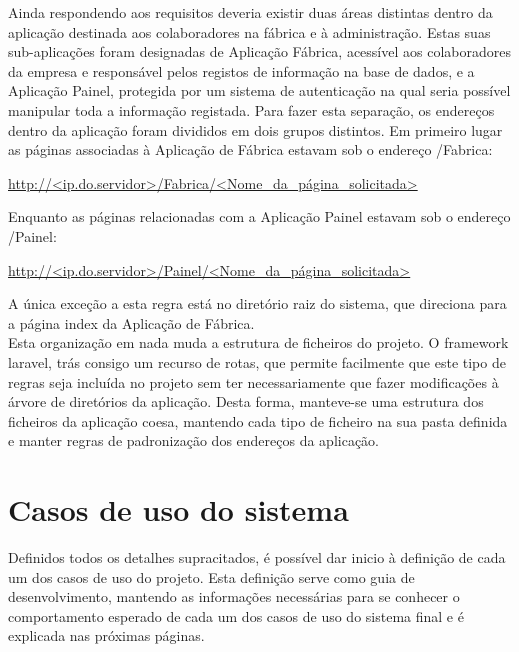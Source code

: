 \noindent 
Ainda respondendo aos requisitos deveria existir duas áreas distintas dentro da aplicação destinada aos colaboradores na fábrica e à administração.
Estas suas sub-aplicações foram designadas de Aplicação Fábrica, acessível aos colaboradores da empresa e responsável pelos registos de informação na base de dados, e a Aplicação Painel, protegida por um sistema de autenticação na qual seria possível manipular toda a informação registada.
Para fazer esta separação, os endereços dentro da aplicação foram divididos em dois grupos distintos. Em primeiro lugar as páginas associadas à Aplicação de Fábrica estavam sob o endereço /Fabrica:

\begin{center}
\url{http://<ip.do.servidor>/Fabrica/<Nome_da_página_solicitada>}
\end{center}

\noindent 
Enquanto as páginas relacionadas com a Aplicação Painel estavam sob o endereço /Painel:

\begin{center}
	\url{http://<ip.do.servidor>/Painel/<Nome_da_página_solicitada>}
\end{center}

\noindent 
A única exceção a esta regra está no diretório raiz do sistema, que direciona para a página index da Aplicação de Fábrica.\\
Esta organização em nada muda a estrutura de ficheiros do projeto. O framework laravel, trás consigo um recurso de rotas, que permite facilmente que este tipo de regras seja incluída no projeto sem ter necessariamente que fazer modificações à árvore de diretórios da aplicação. Desta forma, manteve-se uma estrutura dos ficheiros da aplicação coesa, mantendo cada tipo de ficheiro na sua pasta definida e manter regras de padronização dos endereços da aplicação.

\section{Casos de uso do sistema}
Definidos todos os detalhes supracitados, é possível dar inicio à definição de cada um dos casos de uso do projeto. Esta definição serve como guia de desenvolvimento, mantendo as informações necessárias para se conhecer o comportamento esperado de cada um dos casos de uso do sistema final e é explicada nas próximas páginas.
\newpage


\newpage

\newpage

\newpage

\newpage

\newpage

\newpage

\newpage

\newpage


\newpage

\newpage

\newpage

\newpage

\newpage
